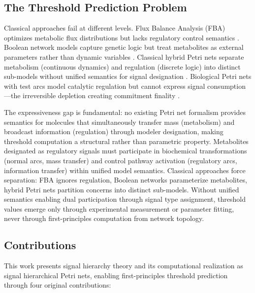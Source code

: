 \documentclass[10pt,letterpaper]{article}
\begin{document}
\subsection{The Threshold Prediction Problem}

Classical approaches fail at different levels. Flux Balance Analysis (FBA) optimizes metabolic flux distributions but lacks regulatory control semantics \cite{orth2010}. Boolean network models capture genetic logic but treat metabolites as external parameters rather than dynamic variables \cite{kauffman1969}. Classical hybrid Petri nets separate metabolism (continuous dynamics) and regulation (discrete logic) into distinct sub-models without unified semantics for signal designation \cite{liu2013,alla1998}. Biological Petri nets \cite{petri1962,murata1989,reddy1993petri} with test arcs model catalytic regulation but cannot express signal consumption---the irreversible depletion creating commitment finality \cite{heiner2008,chaouiya2007petri}.

The expressiveness gap is fundamental: no existing Petri net formalism provides semantics for molecules that simultaneously transfer mass (metabolism) and broadcast information (regulation) through modeler designation, making threshold computation a structural rather than parametric property. Metabolites designated as regulatory signals must participate in biochemical transformations (normal arcs, mass transfer) and control pathway activation (regulatory arcs, information transfer) within unified model semantics. Classical approaches force separation: FBA ignores regulation, Boolean networks parameterize metabolites, hybrid Petri nets partition concerns into distinct sub-models. Without unified semantics enabling dual participation through signal type assignment, threshold values emerge only through experimental measurement or parameter fitting, never through first-principles computation from network topology.

\subsection{Contributions}

This work presents signal hierarchy theory and its computational realization as signal hierarchical Petri nets, enabling first-principles threshold prediction through four original contributions:
\end{document}
